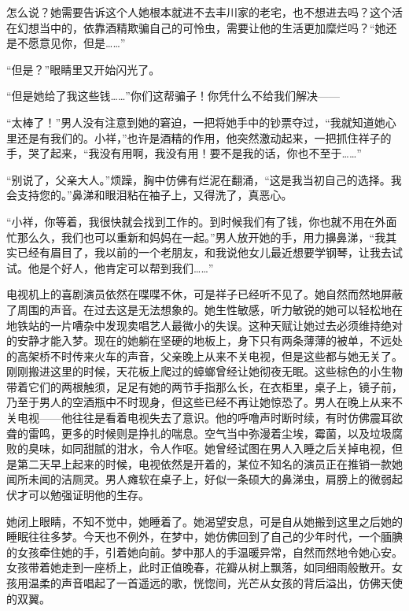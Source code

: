 \documentclass{article}
\begin{document}
怎么说？她需要告诉这个人她根本就进不去丰川家的老宅，也不想进去吗？这个活在幻想当中的，依靠酒精欺骗自己的可怜虫，需要让他的生活更加糜烂吗？“她还是不愿意见你，但是……”



“但是？”眼睛里又开始闪光了。



“但是她给了我这些钱……”你们这帮骗子！你凭什么不给我们解决——



“太棒了！”男人没有注意到她的窘迫，一把将她手中的钞票夺过，“我就知道她心里还是有我们的。小祥，”也许是酒精的作用，他突然激动起来，一把抓住祥子的手，哭了起来，“我没有用啊，我没有用！要不是我的话，你也不至于……”



“别说了，父亲大人。”烦躁，胸中仿佛有烂泥在翻涌，“这是我当初自己的选择。我会支持您的。”鼻涕和眼泪粘在袖子上，又得洗了，真恶心。



“小祥，你等着，我很快就会找到工作的。到时候我们有了钱，你也就不用在外面忙那么久，我们也可以重新和妈妈在一起。”男人放开她的手，用力擤鼻涕，“我其实已经有眉目了，我以前的一个老朋友，和我说他女儿最近想要学钢琴，让我去试试。他是个好人，他肯定可以帮到我们……”



电视机上的喜剧演员依然在喋喋不休，可是祥子已经听不见了。她自然而然地屏蔽了周围的声音。在过去这是无法想象的。她生性敏感，听力敏锐的她可以轻松地在地铁站的一片嘈杂中发现卖唱艺人最微小的失误。这种天赋让她过去必须维持绝对的安静才能入梦。现在的她躺在坚硬的地板上，身下只有两条薄薄的被单，不远处的高架桥不时传来火车的声音，父亲晚上从来不关电视，但是这些都与她无关了。刚刚搬进这里的时候，天花板上爬过的蟑螂曾经让她彻夜无眠。这些棕色的小生物带着它们的两根触须，足足有她的两节手指那么长，在衣柜里，桌子上，镜子前，乃至于男人的空酒瓶中不时现身，但这些已经不再让她惊恐了。男人在晚上从来不关电视——他往往是看着电视失去了意识。他的呼噜声时断时续，有时仿佛震耳欲聋的雷鸣，更多的时候则是挣扎的喘息。空气当中弥漫着尘埃，霉菌，以及垃圾腐败的臭味，如同甜腻的泔水，令人作呕。她曾经试图在男人入睡之后关掉电视，但是第二天早上起来的时候，电视依然是开着的，某位不知名的演员正在推销一款她闻所未闻的洁厕灵。男人瘫软在桌子上，好似一条硕大的鼻涕虫，肩膀上的微弱起伏才可以勉强证明他的生存。



她闭上眼睛，不知不觉中，她睡着了。她渴望安息，可是自从她搬到这里之后她的睡眠往往多梦。今天也不例外，在梦中，她仿佛回到了自己的少年时代，一个腼腆的女孩牵住她的手，引着她向前。梦中那人的手温暖异常，自然而然地令她心安。女孩带着她走到一座桥上，此时正值晚春，花瓣从树上飘落，如同细雨般散开。女孩用温柔的声音唱起了一首遥远的歌，恍惚间，光芒从女孩的背后溢出，仿佛天使的双翼。
\end{document}

